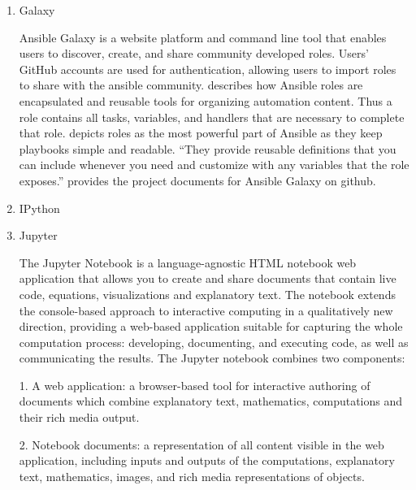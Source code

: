 \begin{enumerate}
\item {} 
Galaxy

Ansible Galaxy is a website platform and command line tool that
enables users to discover, create, and share community developed
roles. Users' GitHub accounts are used for authentication,
allowing users to import roles to share with the ansible
community. \label{\detokenize{i524/technologies:id22}}{\hyperref[\detokenize{i524/technologies:www-galaxy-ansible}]{\sphinxcrossref{{[}20{]}}}} describes how Ansible roles
are encapsulated and reusable tools for organizing automation
content. Thus a role contains all tasks, variables, and handlers
that are necessary to complete that
role. \label{\detokenize{i524/technologies:id23}}{\hyperref[\detokenize{i524/technologies:ansible-book-2016}]{\sphinxcrossref{{[}21{]}}}} depicts roles as the most powerful
part of Ansible as they keep playbooks simple and readable. ``They
provide reusable definitions that you can include whenever you
need and customize with any variables that the role exposes.''
\label{\detokenize{i524/technologies:id24}}{\hyperref[\detokenize{i524/technologies:www-github-galaxy}]{\sphinxcrossref{{[}22{]}}}} provides the project documents for
Ansible Galaxy on github.

\item {} 
IPython

\item {} 
Jupyter

The Jupyter Notebook is a language-agnostic HTML notebook web
application that allows you to create and share documents that
contain live code, equations, visualizations and explanatory
text. \label{\detokenize{i524/technologies:id25}}{\hyperref[\detokenize{i524/technologies:www-jupyter-1}]{\sphinxcrossref{{[}23{]}}}} The notebook extends the console-based
approach to interactive computing in a qualitatively new
direction, providing a web-based application suitable for
capturing the whole computation process: developing, documenting,
and executing code, as well as communicating the
results. \label{\detokenize{i524/technologies:id26}}{\hyperref[\detokenize{i524/technologies:www-jupyter-2}]{\sphinxcrossref{{[}24{]}}}} The Jupyter notebook combines two
components:

1. A web application: a browser-based tool for interactive
authoring of documents which combine explanatory text,
mathematics, computations and their rich media output.

2. Notebook documents: a representation of all content visible in
the web application, including inputs and outputs of the
computations, explanatory text, mathematics, images, and rich
media representations of objects.


\end{enumerate}
